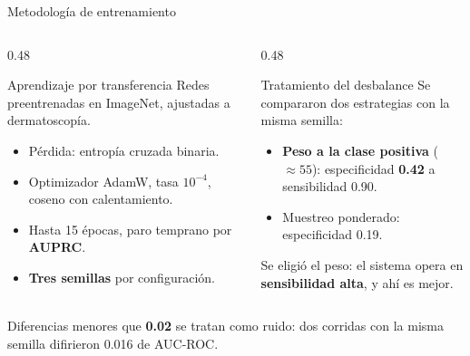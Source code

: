 \documentclass[aspectratio=169,10pt]{beamer}
\begin{document}
\begin{frame}{Metodología de entrenamiento}
  \begin{columns}[T]
    \begin{column}{0.48\textwidth}
      \begin{block}{Aprendizaje por transferencia}
        Redes preentrenadas en ImageNet, ajustadas a dermatoscopía.
        \begin{itemize}
          \item Pérdida: entropía cruzada binaria.
          \item Optimizador AdamW, tasa $10^{-4}$, coseno con calentamiento.
          \item Hasta 15 épocas, paro temprano por \textbf{AUPRC}.
          \item \textbf{Tres semillas} por configuración.
        \end{itemize}
      \end{block}
    \end{column}
    \begin{column}{0.48\textwidth}
      \begin{block}{Tratamiento del desbalance}
        Se compararon dos estrategias con la misma semilla:
        \begin{itemize}
          \item \textbf{Peso a la clase positiva} ($\approx 55$): especificidad \textbf{0.42} a sensibilidad 0.90.
          \item Muestreo ponderado: especificidad 0.19.
        \end{itemize}
        Se eligió el peso: el sistema opera en \textbf{sensibilidad alta}, y ahí es mejor.
      \end{block}
    \end{column}
  \end{columns}
  \vspace{0.6em}
  \begin{center}
    \small Diferencias menores que \textbf{0.02} se tratan como ruido: dos corridas con la misma semilla difirieron 0.016 de AUC-ROC.
  \end{center}
\end{frame}
\end{document}
